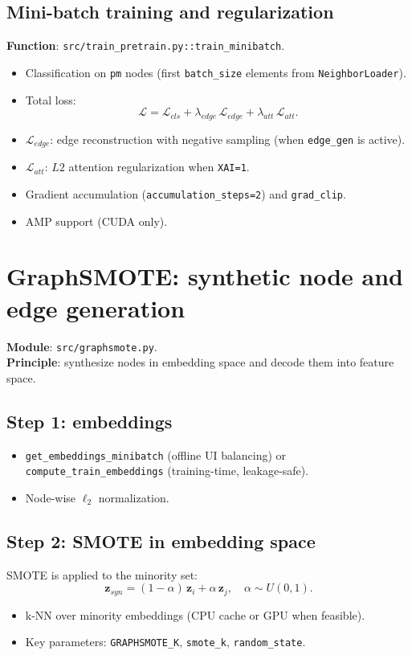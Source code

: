 \subsection{Mini-batch training and regularization}
\textbf{Function}: \texttt{src/train\_pretrain.py::train\_minibatch}.
\begin{itemize}[leftmargin=*]
  \item Classification on \texttt{pm} nodes (first \texttt{batch\_size} elements from \texttt{NeighborLoader}).
  \item Total loss:
  \[
  \mathcal{L} = \mathcal{L}_{cls} + \lambda_{edge}\,\mathcal{L}_{edge} + \lambda_{att}\,\mathcal{L}_{att}.
  \]
  \item \textbf{\(\mathcal{L}_{edge}\)}: edge reconstruction with negative sampling (when \texttt{edge\_gen} is active).
  \item \textbf{\(\mathcal{L}_{att}\)}: $L2$ attention regularization when \texttt{XAI=1}.
  \item Gradient accumulation (\texttt{accumulation\_steps=2}) and \texttt{grad\_clip}.
  \item AMP support (CUDA only).
\end{itemize}

\section{GraphSMOTE: synthetic node and edge generation}
\label{sec:graphsmote}
\textbf{Module}: \texttt{src/graphsmote.py}.\\
\textbf{Principle}: synthesize nodes in embedding space and decode them into feature space.

\subsection{Step 1: embeddings}
\begin{itemize}[leftmargin=*]
  \item \texttt{get\_embeddings\_minibatch} (offline UI balancing) or \texttt{compute\_train\_embeddings} (training-time, leakage-safe).
  \item Node-wise $\ell_2$ normalization.
\end{itemize}

\subsection{Step 2: SMOTE in embedding space}
SMOTE is applied to the minority set:
\[
\mathbf{z}_{syn} = (1-\alpha)\,\mathbf{z}_i + \alpha\,\mathbf{z}_j,\quad \alpha \sim U(0,1).
\]
\begin{itemize}[leftmargin=*]
  \item k-NN over minority embeddings (CPU cache or GPU when feasible).
  \item Key parameters: \texttt{GRAPHSMOTE\_K}, \texttt{smote\_k}, \texttt{random\_state}.
\end{itemize}

